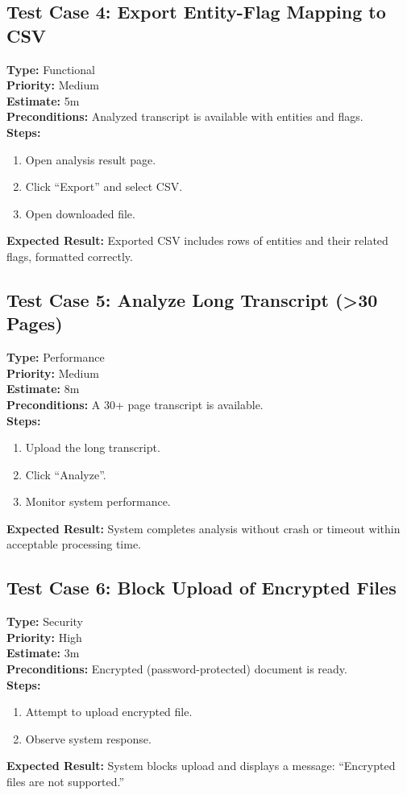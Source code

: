 \documentclass[12pt]{article}
\begin{document}
\subsection*{Test Case 4: Export Entity-Flag Mapping to CSV}
\textbf{Type:} Functional \\
\textbf{Priority:} Medium \\
\textbf{Estimate:} 5m \\
\textbf{Preconditions:} Analyzed transcript is available with entities and flags. \\
\textbf{Steps:}
\begin{enumerate}[label=\arabic*.]
\item Open analysis result page.
\item Click “Export” and select CSV.
\item Open downloaded file.
\end{enumerate}
\textbf{Expected Result:} Exported CSV includes rows of entities and their related flags, formatted correctly.

\subsection*{Test Case 5: Analyze Long Transcript (>30 Pages)}
\textbf{Type:} Performance \\
\textbf{Priority:} Medium \\
\textbf{Estimate:} 8m \\
\textbf{Preconditions:} A 30+ page transcript is available. \\
\textbf{Steps:}
\begin{enumerate}[label=\arabic*.]
\item Upload the long transcript.
\item Click “Analyze”.
\item Monitor system performance.
\end{enumerate}
\textbf{Expected Result:} System completes analysis without crash or timeout within acceptable processing time.

\subsection*{Test Case 6: Block Upload of Encrypted Files}
\textbf{Type:} Security \\
\textbf{Priority:} High \\
\textbf{Estimate:} 3m \\
\textbf{Preconditions:} Encrypted (password-protected) document is ready. \\
\textbf{Steps:}
\begin{enumerate}[label=\arabic*.]
\item Attempt to upload encrypted file.
\item Observe system response.
\end{enumerate}
\textbf{Expected Result:} System blocks upload and displays a message: “Encrypted files are not supported.”
\end{document}
